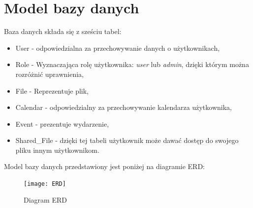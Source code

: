 \section{Model bazy danych}
\label{sec:bd}
Baza danych składa się z sześciu tabel:
\begin{itemize}
	\item User - odpowiedzialna za przechowywanie danych o użytkownikach,
	\item Role - Wyznaczająca rolę użytkownika: \textit{user} lub \textit{admin}, dzięki którym można rozróżnić uprawnienia,
	\item File - Reprezentuje plik,
	\item Calendar - odpowiedzialny za przechowywanie kalendarza użytkownika,
	\item Event - prezentuje wydarzenie,
	\item Shared\_File - dzięki tej tabeli użytkownik może dawać dostęp do swojego pliku innym użytkownikom.
\end{itemize}
Model bazy danych przedstawiony jest poniżej na diagramie ERD:
\begin{figure}[H]
\centering
\texttt{[image: ERD]}
\caption{\label{fig:diag_02}Diagram ERD}
\end{figure}

